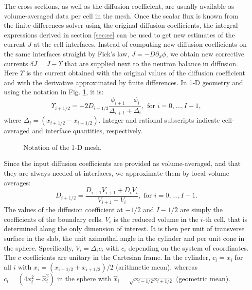 \documentclass{ictt26}
\begin{document}
The cross sections, as well as the diffusion coefficient, are usually available as volume-averaged data per cell in the mesh. Once the scalar flux is known from the finite differences solver using the original diffusion coefficients, the integral expressions derived in section \ref{sec:ce} can be used to get new estimates of the current $J$ at the cell interfaces. %
Instead of computing new diffusion coefficients on the same interfaces straight by Fick's law, $J = -D \partial_x \phi$, we obtain new corrective currents $\delta J = J - \Upsilon$ that are supplied next to the neutron balance in diffusion. Here $\Upsilon$ is the current obtained with the original values of the diffusion coefficient and with the derivative approximated by finite differences. In 1-D %
geometry and using the notation in Fig. \ref{fig:mesh1D}, it is:
\begin{equation}
  \Upsilon_{i+1/2} = -2 D_{i+1/2} \frac{\phi_{i+1} - \phi_{i}}{\Delta_{i+1} + \Delta_{i}}, \text{ for } i = 0, \ldots, I-1,
  \label{eq:cmfd}
\end{equation}
where $\Delta_i = (x_{i+1/2} - x_{i-1/2})$. Integer and rational subscripts indicate cell-averaged and interface quantities, respectively.
%
\begin{figure}[b]
\centering

\caption{Notation of the 1-D mesh.}
\label{fig:mesh1D}
\end{figure}
Since the input diffusion coefficients are provided as volume-averaged, and that they are always needed at interfaces, we approximate them by local volume averages:
\begin{equation}
  D_{i+1/2} = \frac{D_{i+1} V_{i+1} + D_{i} V_i}{V_{i+1} + V_i}, \text{ for } i = 0, \ldots, I-1.
  \label{eq:dc0}
\end{equation}
The values of the diffusion coefficient at $-1/2$ and $I-1/2$ are simply the coefficients of the boundary cells. $V_i$ is the reduced volume in the $i$-th cell, that is determined along the only dimension of interest. It is then per unit of transverse surface in the slab, the unit azimuthal angle in the cylinder and per unit cone in the sphere. Specifically, $V_i = \Delta_i c_i$ with $c_i$ depending on the system of coordinates. The $c$ coefficients are unitary in the Cartesian frame. In the cylinder, $c_i = x_i$ for all $i$ with $x_i = (x_{i-1/2} + x_{i+1/2}) / 2$ (arithmetic mean), whereas $c_i = (4 x_i^2 - \hat{x}_i^2)$ in the sphere with $\hat{x}_i = \sqrt{x_{i-1/2} x_{i+1/2}}$ (geometric mean).
\end{document}
